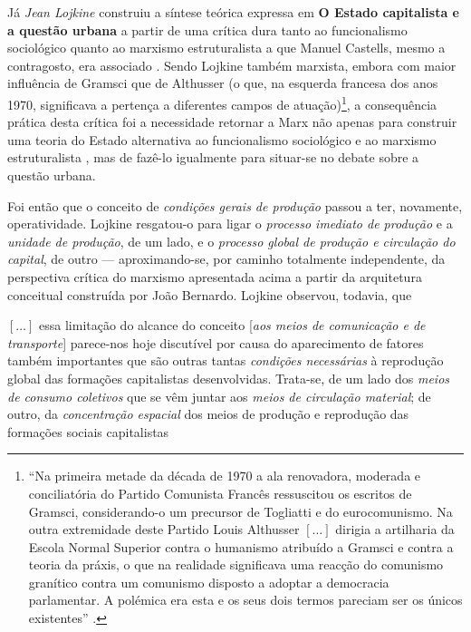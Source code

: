 Já \textit{Jean Lojkine} construiu a síntese teórica expressa em \textbf{O Estado capitalista e a questão urbana} a partir de uma crítica dura tanto ao funcionalismo sociológico quanto ao marxismo estruturalista a que Manuel Castells, mesmo a contragosto, era associado \cite[p.~79-105]{LOJKINE1997}. Sendo Lojkine também marxista, embora com maior influência de Gramsci que de Althusser (o que, na esquerda francesa dos anos 1970, significava a pertença a diferentes campos de atuação)\footnote{``Na primeira metade da década de 1970 a ala renovadora, moderada e conciliatória do Partido Comunista Francês ressuscitou os escritos de Gramsci, considerando-o um precursor de Togliatti e do eurocomunismo. Na outra extremidade deste Partido Louis Althusser \([\dots]\) dirigia a artilharia da Escola Normal Superior contra o humanismo atribuído a Gramsci e contra a teoria da práxis, o que na realidade significava uma reacção do comunismo granítico contra um comunismo disposto a adoptar a democracia parlamentar. A polémica era esta e os seus dois termos pareciam ser os únicos existentes'' \cite{MANOLOBERNARDO2012}.}, a consequência prática desta crítica foi a necessidade retornar a Marx não apenas para construir uma teoria do Estado alternativa ao funcionalismo sociológico e ao marxismo estruturalista \cite[p.~106-141]{LOJKINE1997}, mas de fazê-lo igualmente para situar-se no debate sobre a questão urbana.

Foi então que o conceito de \textit{condições gerais de produção} passou a ter, novamente, operatividade. Lojkine resgatou-o para ligar o \textit{processo imediato de produção} e a \textit{unidade de produção}, de um lado, e o \textit{processo global de produção e circulação do capital}, de outro --- aproximando-se, por caminho totalmente independente, da perspectiva crítica do marxismo apresentada acima a partir da arquitetura conceitual construída por João Bernardo. Lojkine observou, todavia, que

\begin{citacao}
\([\dots]\) essa limitação do alcance do conceito [\textit{aos meios de comunicação e de transporte}] parece-nos hoje discutível por causa do aparecimento de fatores também importantes que são outras tantas \textit{condições necessárias} à reprodução global das formações capitalistas desenvolvidas. Trata-se, de um lado dos \textit{meios de consumo coletivos} que se vêm juntar aos \textit{meios de circulação material}; de outro, da \textit{concentração espacial} dos meios de produção e reprodução das formações sociais capitalistas \cite[p.~145]{LOJKINE1997}
\end{citacao}


